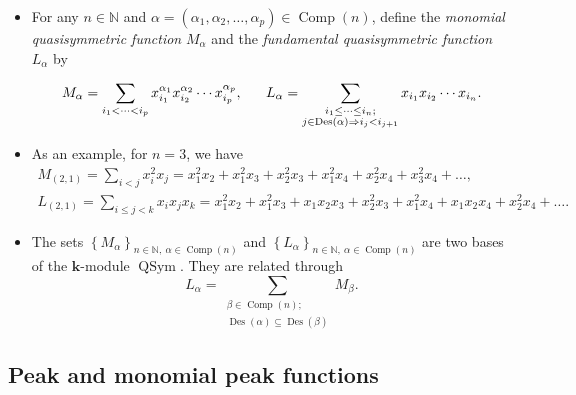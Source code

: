 \documentclass[numbers=enddot,12pt,final,onecolumn,notitlepage]{scrartcl}%
\newcommand{\al}{\alpha}
\newcommand{\NN}{\mathbb{N}} %
\newcommand{\kk}{\mathbf{k}} %
\newcommand{\QSym}{\operatorname{QSym}}
\newcommand{\Des}{\operatorname{Des}}
\newcommand{\Comp}{\operatorname{Comp}}
\newcommand{\defn}[1]{{\color{darkred}\emph{#1}}}
\newcommand{\0}{\phantom{c}}
\let\sumnonlimits\sum
\renewcommand{\sum}{\sumnonlimits\limits}
\begin{document}
\begin{itemize}
\item For any $n \in \NN$ and $\al =(\al_1,\al_2,\dots,\al_p) \in \Comp(n)$, define the \defn{monomial quasisymmetric function} $M_\al$ and the \defn{fundamental quasisymmetric function} $L_\al$ by

\begin{equation*}
\label{eq : M+L}
M_{\al} = \sum\limits_{i_1 < \cdots < i_p} x_{i_1}^{\al_1}x_{i_2}^{\al_2} \cdots x_{i_p}^{\al_p},\;\;\;\;\;\; L_{\al} = \sum\limits_{\substack{i_1 \leq \cdots \leq i_n;\\j\in \Des(\al) \Rightarrow i_j<i_{j+1}}} x_{i_1}x_{i_2} \cdots x_{i_n}.
\end{equation*}

\item As an example, for $n=3$, we have
\begin{gather*}
M_{(2,1)}=\sum_{i<j}x_{i}^{2}x_{j}=x_{1}^{2}x_{2}+x_{1}%
^{2}x_{3}+x_{2}^{2}x_{3}+x_{1}^{2}x_{4}+x_{2}^{2}x_{4}+x_{3}^{2}x_{4}+\dots,\\
L_{(2,1)}=\sum_{i\leq j <k}x_{i}x_{j}x_k=x_{1}^{2}x_{2}+x_{1}%
^{2}x_{3}+x_{1}x_{2}x_3+x_{2}^{2}x_{3}+x_{1}^{2}x_{4}+x_{1}
x_{2}x_{4}+x_{2}^{2}x_{4}+\dots.
\end{gather*}
\item The sets $\left\{M_\al\right\}_{n\in \NN,\ \al\in \Comp(n)}$
and $\left\{L_\al\right\}_{n\in \NN,\ \al\in \Comp(n)}$
are two bases of the $\kk$-module $\QSym$.
They are related through
\begin{equation}
\label{eq : LM} L_{\al} = \sum_{{\substack{\beta \in \Comp(n);\\\Des(\alpha) \subseteq \Des(\beta)}}} M_{\beta}.
\end{equation}
\end{itemize}

\subsection{Peak and monomial peak functions}
\end{document}
